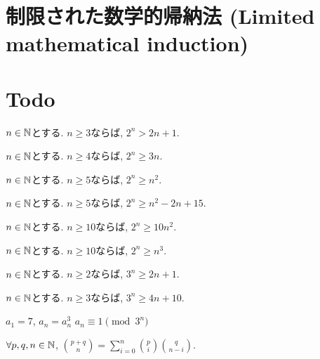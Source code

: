 \section{制限された数学的帰納法 (Limited mathematical induction)}

\section{Todo}


\begin{prop}
$n\in\mathbb{N}$とする.
  $n\geq 3$ならば, $2^n> 2n+1$.
\end{prop}

\begin{prop}
$n\in\mathbb{N}$とする.
  $n\geq 4$ならば, $2^n\geq 3n$.
\end{prop}


\begin{prop}
$n\in\mathbb{N}$とする.
  $n\geq 5$ならば, $2^n\geq n^2$.
\end{prop}

\begin{prop}
$n\in\mathbb{N}$とする.
  $n\geq 5$ならば, $2^n\geq n^2-2n+15$.
\end{prop}

\begin{prop}
$n\in\mathbb{N}$とする.
  $n\geq 10$ならば, $2^n\geq 10n^2$.
\end{prop}

\begin{prop}
$n\in\mathbb{N}$とする.
  $n\geq 10$ならば, $2^n\geq n^3$.
\end{prop}

\begin{prop}
$n\in\mathbb{N}$とする.
  $n\geq 2$ならば, $3^n \geq 2n+1$.
\end{prop}

\begin{prop}
$n\in\mathbb{N}$とする.
  $n\geq 3$ならば, $3^n\geq 4n+10$.
\end{prop}





\begin{prop}
  $a_1=7$, $a_{n}=a_{n}^3$
  $a_n\equiv 1\pmod{3^n}$
\end{prop}


\begin{prop}
  $\forall p,q,n\in\mathbb{N}$,
  $\binom{p+q}{n}=\sum_{i=0}^n\binom{p}{i}\binom{q}{n-i}$.
\end{prop}



